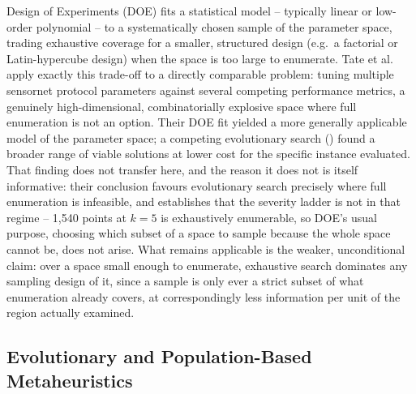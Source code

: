 \documentclass{article}
\begin{document}
Design of Experiments (DOE) fits a statistical model -- typically linear or
low-order polynomial -- to a systematically chosen sample of the parameter
space, trading exhaustive coverage for a smaller, structured design (e.g.\ a
factorial or Latin-hypercube design) when the space is too large to enumerate.
Tate et al.~\cite{R:Tate:2009a} apply exactly this trade-off to a
directly comparable problem: tuning multiple sensornet protocol parameters
against several competing performance metrics, a genuinely high-dimensional,
combinatorially explosive space where full enumeration is not an option. Their
DOE fit yielded a more generally applicable model of the parameter space; a
competing evolutionary search () found a broader range
of viable solutions at lower cost for the specific instance evaluated. That
finding does not transfer here, and the reason it does not is itself
informative: their conclusion favours evolutionary search precisely where full
enumeration is infeasible, and  establishes that the
severity ladder is not in that regime -- 1{,}540 points at $k=5$ is exhaustively
enumerable, so DOE's usual purpose, choosing which subset of a space to sample
because the whole space cannot be, does not arise. What remains applicable is
the weaker, unconditional claim: over a space small enough to enumerate,
exhaustive search dominates any sampling design of it, since a sample is only
ever a strict subset of what enumeration already covers, at correspondingly
less information per unit of the region actually examined.

\subsection{Evolutionary and Population-Based Metaheuristics}
\label{sec:evolutionary}
\end{document}
